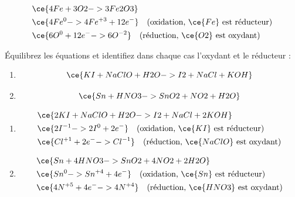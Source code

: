 \documentclass[
  11pt,
  french,
  a4paper,
  openany]{book}
\providecommand{\tightlist}{%
  \setlength{\itemsep}{0pt}\setlength{\parskip}{0pt}}
\begin{document}
\begin{Answer}
\[
\begin{split}
& \ce{4 Fe + 3 O2 -> 3 Fe2O3} \\
& \ce{ 4 Fe^{0} -> 4 Fe^{+3} + 12 e^-} \quad \text{(oxidation, $\ce{Fe}$ est réducteur)} \\
& \ce{ 6 O^{0} + 12 e^- -> 6 O^{-2}} \quad \text{(réduction, $\ce{O2}$ est oxydant)}
\end{split}
\]

\end{Answer}

\begin{Exercise}

Équilibrez les équations et identifiez dans chaque cas l'oxydant et le réducteur :

\begin{enumerate}
\def\labelenumi{\alph{enumi}.}
\tightlist
\item
  \[
  \ce{ KI + NaClO + H2O -> I2 + NaCl + KOH }
  \]
\item
  \[
  \ce{ Sn + HNO3 -> SnO2 + NO2 + H2O }
  \]
\end{enumerate}


\end{Exercise}

\begin{Answer}

\begin{enumerate}
\def\labelenumi{\alph{enumi}.}
\tightlist
\item
  \[
  \begin{split}
  & \ce{2 KI + NaClO + H2O -> I2 + NaCl + 2 KOH} \\
  & \ce{ 2 I^{-1} -> 2 I^{0} + 2 e^-} \quad \text{(oxidation, $\ce{KI}$ est réducteur)} \\
  & \ce{ Cl^{+1} + 2 e^- -> Cl^{-1}} \quad \text{(réduction, $\ce{NaClO}$ est oxydant)}
  \end{split}
  \]
\item
  \[
  \begin{split}
  & \ce{ Sn + 4 HNO3 -> SnO2 + 4 NO2 + 2 H2O } \\
  & \ce{ Sn^{0} -> Sn^{+4} + 4 e^-} \quad \text{(oxidation, $\ce{Sn}$ est réducteur)} \\
  & \ce{ 4 N^{+5} + 4 e^- -> 4 N^{+4}} \quad \text{(réduction, $\ce{HNO3}$ est oxydant)}
  \end{split}
  \]
\end{enumerate}


\end{Answer}
\end{document}
